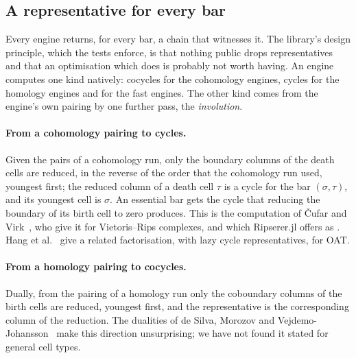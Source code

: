 \subsection{A representative for every bar}\label{sec:representatives}

Every engine returns, for every bar, a chain that witnesses it. The library's design principle, which the tests enforce, is
that nothing public drops representatives and that an optimisation which does is probably not worth having. An
engine computes one kind natively: cocycles for the cohomology engines, cycles for the homology engines and for the fast
engines. The other kind comes from the engine's own pairing by one further pass, the \emph{involution}.

\paragraph{From a cohomology pairing to cycles.}
Given the pairs of a cohomology run, only the boundary columns of the death cells are reduced, in the reverse of the order
that the cohomology run used, youngest first; the reduced column of a death cell $\tau$ is a cycle for the bar $(\sigma,\tau)$,
and its youngest cell is $\sigma$. An essential bar gets the cycle that reducing the boundary of its birth cell to zero
produces. This is the computation of \v{C}ufar and Virk~\cite{cufar2021involuted}, who give it for Vietoris--Rips
complexes, and which Ripserer.jl offers as . Hang et al.~\cite{hang2021umatch} give a
related factorisation, with lazy cycle representatives, for OAT.

\paragraph{From a homology pairing to cocycles.}
Dually, from the pairing of a homology run only the coboundary columns of the birth cells are reduced, youngest first, and the
representative is the corresponding column of the reduction. The dualities of de Silva, Morozov and
Vejdemo-Johansson~\cite{desilva2011dualities} make this direction unsurprising; we have not found it stated for general
cell types.

